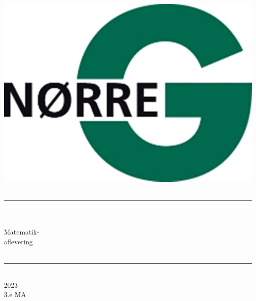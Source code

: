 \documentclass[12pt,x11names,a4paper]{article}
\begin{document}
%

\begin{titlepage}

\begin{minipage}{0.27\textwidth}

\end{minipage}
\begin{minipage}{0.73\textwidth}
\begin{center}
\phantom{h} \vspace{1cm}\\
\hspace{4cm}
\includegraphics[scale = 1]{Billeder/Norreg.png} \\
\phantom{h} \vspace{5cm}\\
\rule{0.7\textwidth}{0.3mm}\\
\phantom{h}\\
{\fontsize{50}{60}\selectfont Matematik-\\aflevering}\\
\phantom{h}\\
\rule{0.7\textwidth}{0.3mm}\\
\Large 2023\\
\Large 3.e MA

\end{center}
\end{minipage}
\end{titlepage}
\end{document}
